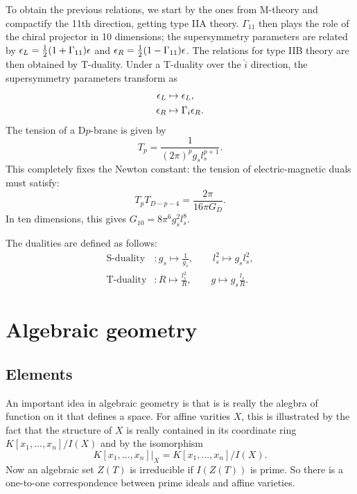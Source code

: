     To obtain the previous relations, we start by the ones from M-theory and compactify the 11th direction, getting type IIA theory. $\Gamma_{11}$ then plays the role of the chiral projector in 10 dimensions; the supersymmetry parameters are related by $\epsilon_L=\frac{1}{2}(1+\Gamma_{11})\epsilon$ and $\epsilon_R=\frac{1}{2}(1-\Gamma_{11})\epsilon$. The relations for type IIB theory are then obtained by T-duality. Under a T-duality over the $\hat{i}$ direction, the supersymmetry parameters transform as
    \begin{align*}
        \epsilon_L &\mapsto \epsilon_L,\\
        \epsilon_R &\mapsto \Gamma_i\epsilon_R.
    \end{align*}
    The tension of a D$p$-brane is given by
    \begin{equation}
        T_{p} = \frac{1}{(2\pi)^pg_sl^{p+1}_s}.
    \end{equation}
    This completely fixes the Newton constant: the tension of electric-magnetic duals must satisfy:
    \begin{equation}
        T_pT_{D-p-4} = \frac{2\pi}{16\pi G_D}.
    \end{equation}
    In ten dimensions, this gives $G_{10}=8\pi^6g^2_sl^8_s$.

    The dualities are defined as follows:
    \begin{align*}
        \text{S-duality} &: g_s\mapsto\frac{1}{g_s},\qquad l^2_s\mapsto g_sl^2_s,\\
        \text{T-duality} &: R\mapsto\frac{l^2_s}{R},\qquad g\mapsto g_s\frac{l_s}{R}.
    \end{align*}

\section{Algebraic geometry}

    \subsection{Elements}

        An important idea in algebraic geometry is that is is really the alegbra of function on it that defines a space. For affine varities $X$, this is illustrated by the fact that the structure of $X$ is really contained in its coordinate ring $K[x_1,\dots,x_n]/I(X)$ and by the isomorphism
        \begin{equation}
            K[x_1,\dots,x_n]|_X=K[x_1,\dots,x_n]/I(X).
        \end{equation}
        Now an algebraic set $Z(T)$ is irreducible if $I(Z(T))$ is prime. So there is a one-to-one correspondence between prime ideals and affine varieties.

